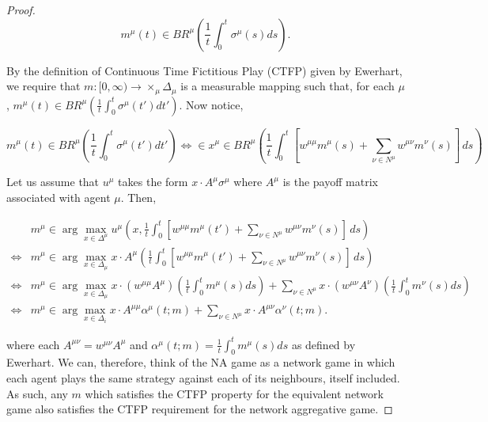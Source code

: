 \documentclass{article}
\theoremstyle{definition}
\newcommand{\wmunu}{w^{\mu \nu}}
\begin{document}
	\begin{proof}

		\begin{equation}
			m^\mu(t) \in BR^\mu \left( \frac{1}{t} \int_{0}^{t} \sigma^\mu(s) ds \right).
		\end{equation}
		
		By the definition of Continuous Time Fictitious Play (CTFP) given by Ewerhart, we require that $m: [0, \infty) \rightarrow \times_\mu \Delta_\mu$ is a measurable mapping such that, for each $\mu$, $m^\mu(t) \in BR^\mu \left( \frac{1}{t} \int_{0}^{t} \sigma^\mu(t') dt' \right)$. Now notice,
		
		\begin{equation*}
			m^\mu(t) \in BR^\mu \left( \frac{1}{t} \int_{0}^{t} \sigma^\mu(t') dt' \right) \iff  \in x^\mu\in BR^\mu \left( \frac{1}{t} \int_{0}^{t} [w^{\mu \mu} m^\mu(s) + \sum_{\nu \in N^\mu} w^{\mu \nu} m^\nu(s)] \, ds \right)
		\end{equation*}
		
		Let us assume that $u^\mu$ takes the form $x \cdot A^\mu \sigma^\mu$ where $A^\mu$ is the payoff matrix associated with agent $\mu$. Then,
		
		\begin{align}
			& m^\mu \in \arg\max_{x \in \Delta^\mu} u^\mu(x,\frac{1}{t} \int_{0}^{t} [w^{\mu \mu} m^\mu(t') + \sum_{\nu \in N^\mu} w^{\mu \nu} m^\nu(s)] \, ds) \nonumber \\
			\iff & m^\mu \in \arg\max_{x \in \Delta_\mu} x \cdot A^\mu \left(\frac{1}{t} \int_{0}^{t} [w^{\mu \mu} m^\mu(t') + \sum_{\nu \in N^\mu} w^{\mu \nu} m^\nu(s)] \, ds \right) \nonumber \\
			\iff & m^\mu \in \arg \max_{x \in \Delta_\mu} x \cdot (w^{\mu \mu} A^\mu) \left( \frac{1}{t} \int_{0}^{t} m^\mu(s) ds\right) + \sum_{\nu \in N^\mu} x \cdot (\wmunu A^\nu) \left( \frac{1}{t} \int_{0}^{t} m^\nu(s) ds \right) \nonumber \\
			\iff & m^\mu \in \arg \max_{x \in \Delta_i} x \cdot A^{\mu \mu} \alpha^\mu(t; m) + \sum_{\nu \in N^\mu} x \cdot A^{\mu \nu} \alpha^\nu(t; m).
		\end{align}
		
		where each $A^{\mu \nu} = \wmunu A^\mu$ and $\alpha^\mu(t; m) =\frac{1}{t} \int_{0}^{t} m^\mu(s) ds$ as defined by Ewerhart. We can, therefore, think of the NA game as a network game in which each agent plays the same strategy against each of its neighbours, itself included. As such, any $m$ which satisfies the CTFP property for the equivalent network game also satisfies the CTFP requirement for the network aggregative game. 
		

\end{proof}
\end{document}
